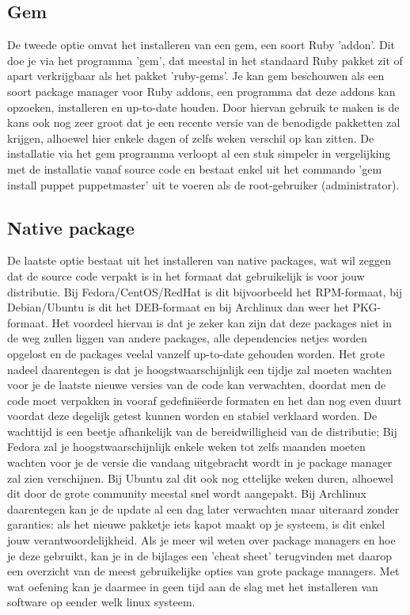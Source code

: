 \subsection{Gem}
De tweede optie omvat het installeren van een gem, een soort Ruby 'addon'. Dit doe je via het programma 'gem', dat meestal in het standaard Ruby pakket zit of apart verkrijgbaar als het pakket 'ruby-gems'. Je kan gem beschouwen als een soort package manager voor Ruby addons, een programma dat deze addons kan opzoeken, installeren en up-to-date houden. Door hiervan gebruik te maken is de kans ook nog zeer groot dat je een recente versie van de benodigde pakketten zal krijgen, alhoewel hier enkele dagen of zelfs weken verschil op kan zitten. De installatie via het gem programma verloopt al een stuk simpeler in vergelijking met de installatie vanaf source code en bestaat enkel uit het commando 'gem install puppet puppetmaster' uit te voeren als de root-gebruiker (administrator).
%
\subsection{Native package}
De laatste optie bestaat uit het installeren van native packages, wat wil zeggen dat de source code verpakt is in het formaat dat gebruikelijk is voor jouw distributie. Bij Fedora/CentOS/RedHat is dit bijvoorbeeld het RPM-formaat, bij Debian/Ubuntu is dit het DEB-formaat en bij Archlinux dan weer het PKG-formaat. Het voordeel hiervan is dat je zeker kan zijn dat deze packages niet in de weg zullen liggen van andere packages, alle dependencies netjes worden opgelost en de packages veelal vanzelf up-to-date gehouden worden. Het grote nadeel daarentegen is dat je hoogstwaarschijnlijk een tijdje zal moeten wachten voor je de laatste nieuwe versies van de code kan verwachten, doordat men de code moet verpakken in vooraf gedefini\"{e}erde formaten en het dan nog even duurt voordat deze degelijk getest kunnen worden en stabiel verklaard worden. De wachttijd is een beetje afhankelijk van de bereidwilligheid van de distributie; Bij Fedora zal je hoogstwaarschijnlijk enkele weken tot zelfs maanden moeten wachten voor je de versie die vandaag uitgebracht wordt in je package manager zal zien verschijnen. Bij Ubuntu zal dit ook nog ettelijke weken duren, alhoewel dit door de grote community meestal snel wordt aangepakt. Bij Archlinux daarentegen kan je de update al een dag later verwachten maar uiteraard zonder garanties: als het nieuwe pakketje iets kapot maakt op je systeem, is dit enkel jouw verantwoordelijkheid. Als je meer wil weten over package managers en hoe je deze gebruikt, kan je in de bijlages een 'cheat sheet' terugvinden met daarop een overzicht van de meest gebruikelijke opties van grote package managers. Met wat oefening kan je daarmee in geen tijd aan de slag met het installeren van software op eender welk linux systeem.

